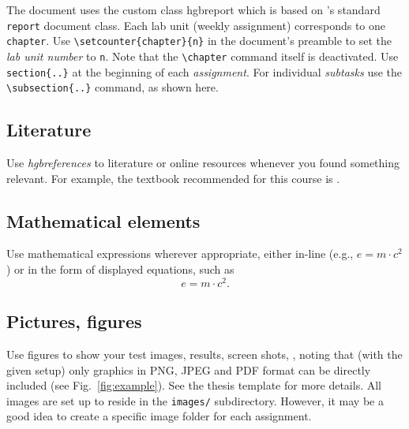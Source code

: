 \documentclass[english,notitlepage,smartquotes]{hgbreport}
\renewcommand{\chapter}[1]{} %
\begin{document}
The document uses the custom class \textsf{hgbreport} which is based on
\latex's standard \texttt{report} document class. Each lab unit (weekly
assignment) corresponds to one \texttt{chapter}. Use
\verb!\setcounter{chapter}{n}! in the document's preamble to set the
\emph{lab unit number} to \texttt{n}. Note that the \verb!\chapter! command
itself is deactivated. Use \verb!section{..}! at the beginning of each
\emph{assignment}. For individual \emph{subtasks} use the
\verb!\subsection{..}! command, as shown here.

\subsection{Literature}

Use \emph{hgbreferences} to literature or online resources whenever you found 
something relevant. For example, the textbook recommended for this course is
\cite{Sedgewick2011}.

\subsection{Mathematical elements}

Use mathematical expressions wherever appropriate, either in-line 
(e.g., $e = m \cdot c^2$) or in the form of displayed equations, such as
%
\begin{equation}
	e = m \cdot c^2 .
\end{equation}

\subsection{Pictures, figures}

Use figures to show your test images, results, screen shots, \etc, noting
that (with the given setup) only graphics in PNG, JPEG and PDF format can be
directly included (see Fig.~\ref{fig:example}). See the thesis template for
more details. All images are set up to reside in the \verb!images/!
subdirectory. However, it may be a good idea to create a specific image
folder for each assignment.
\end{document}
